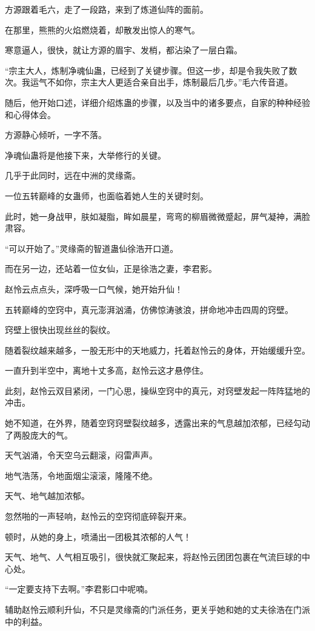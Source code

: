 \begin{this_body}
方源跟着毛六，走了一段路，来到了炼道仙阵的面前。

在那里，熊熊的火焰燃烧着，却散发出惊人的寒气。

寒意逼人，很快，就让方源的眉宇、发梢，都沾染了一层白霜。

“宗主大人，炼制净魂仙蛊，已经到了关键步骤。但这一步，却是令我失败了数次。我运气不如你，宗主大人更适合亲自出手，炼制最后几步。”毛六传音道。

随后，他开始口述，详细介绍炼蛊的步骤，以及当中的诸多要点，自家的种种经验和心得体会。

方源静心倾听，一字不落。

净魂仙蛊将是他接下来，大举修行的关键。

几乎于此同时，远在中洲的灵缘斋。

一位五转巅峰的女蛊师，也面临着她人生的关键时刻。

此时，她一身战甲，肤如凝脂，眸如晨星，弯弯的柳眉微微蹙起，屏气凝神，满脸肃容。

“可以开始了。”灵缘斋的智道蛊仙徐浩开口道。

而在另一边，还站着一位女仙，正是徐浩之妻，李君影。

赵怜云点点头，深呼吸一口气候，她开始升仙！

五转巅峰的空窍中，真元澎湃汹涌，仿佛惊涛骇浪，拼命地冲击四周的窍壁。

窍壁上很快出现丝丝的裂纹。

随着裂纹越来越多，一股无形中的天地威力，托着赵怜云的身体，开始缓缓升空。

一直升到半空中，离地十丈多高，赵怜云这才悬停住。

此刻，赵怜云双目紧闭，一门心思，操纵空窍中的真元，对窍壁发起一阵阵猛地的冲击。

她不知道，在外界，随着空窍窍壁裂纹越多，透露出来的气息越加浓郁，已经勾动了两股庞大的气。

天气汹涌，令天空乌云翻滚，闷雷声声。

地气浩荡，令地面烟尘滚滚，隆隆不绝。

天气、地气越加浓郁。

忽然啪的一声轻响，赵怜云的空窍彻底碎裂开来。

顿时，从她的身上，喷涌出一团极其浓郁的人气！

天气、地气、人气相互吸引，很快就汇聚起来，将赵怜云团团包裹在气流巨球的中心处。

“一定要支持下去啊。”李君影口中呢喃。

辅助赵怜云顺利升仙，不只是灵缘斋的门派任务，更关乎她和她的丈夫徐浩在门派中的利益。


\end{this_body}
